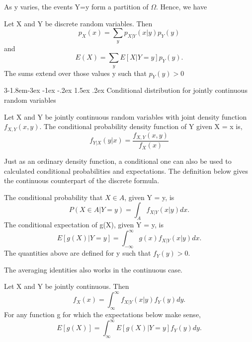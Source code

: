 \documentclass{tufte-handout}
\makeatletter
\renewcommand{\subsection}{\@startsection{subsection}%
    {3}{-1.8em}{-3ex \@plus -1ex \@minus -.2ex}%
    {1.5ex \@plus .2ex}
    {\hspace*{-5.5em}\fcolorbox{ltblue}{ltblue}{\parbox[c][1.0ex][b]{4em}{\phantom{space}}}
    \normalfont\large\itshape\color{ltblue}}}
\makeatother
\begin{document}
    \noindent  As y varies, the events {Y=y} form a partition of $ \Omega $. Hence, we have
    \begin{Theorem}
        Let X and Y be discrete random variables. Then
        \[p_X(x)=\sum_y p_{X|Y}(x|y)p_{Y}(y)\]
        and
        \[E(X) = \sum_y E[X|Y=y]p_Y(y).\]
        The sums extend over those values y such that $ p_Y(y)>0 $
    \end{Theorem}

    \subsection{Conditional distribution for jointly continuous random variables}

    \begin{Definition}
        Let X and Y be jointly continuous random variables with joint density function $ f_{X,Y}(x,y).$
         The conditional probability density function of Y given X = x is,
        \[f_{Y|X }(y|x ) = \frac{f_{X,Y}(x,y)}{f_{X }(x)}\]
    \end{Definition}

    Just as an ordinary density function, a conditional one can also be used to calculated conditional 
    probabilities and expectations. The definition below gives the continuous counterpart of the discrete formula.

    \begin{Definition}
        The conditional probability that $ X \in A  $, given Y = y, is 
        \[P(X\in A|Y=y)=\int_A f_{X|Y}(x|y)dx.\]
        The conditional expectation of g(X), given Y = y, is
        \[E[g(X)|Y=y]=\int_{-\infty}^{\infty}g(x)f_{X|Y }(x|y)dx.\]
        The quantities above are defined for y such that $ f_Y(y)>0 $.
    \end{Definition}

    The averaging identities also works in the continuous case.

    \begin{Theorem}
        Let X and Y be jointly continuous. Then
        \[f_X(x) =\int_{\infty}^{\infty}f_{X|Y}(x|y)f_Y(y)dy. \]
        For any function g for which the expectations below make sense,
        \[E[g(X)]=\int_{\infty}^{\infty}E[g(X)|Y=y]f_Y(y)dy.\]
    \end{Theorem}

\end{document}
